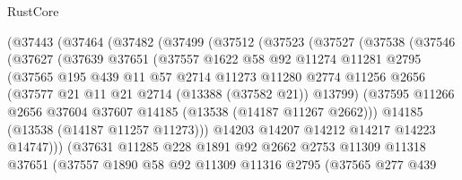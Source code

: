 \begin{lexlean}{RustCore}
\begin{coremodule}
          (@37443
            (@37464
              (@37482
                (@37499
                  (@37512
                    (@37523
                      (@37527
                        (@37538
                          (@37546
                            (@37627
                              (@37639
                                @37651
                                (@37557
                                  @1622
                                  @58
                                  @92
                                  @11274
                                  @11281
                                  @2795
                                  (@37565
                                    @195
                                    @439
                                    @11
                                    @57
                                    @2714
                                    @11273
                                    @11280
                                    @2774
                                    @11256
                                    @2656
                                    (@37577 @21 @11 @21 @2714 (@13388 (@37582 @21)) @13799)
                                    (@37595
                                      @11266
                                      @2656
                                      @37604
                                      @37607
                                      @14185
                                      (@13538 (@14187 @11267 @2662)))
                                    @14185
                                    (@13538 (@14187 @11257 @11273)))
                                  @14203
                                  @14207
                                  @14212
                                  @14217
                                  @14223
                                  @14747)))
                            (@37631
                              @11285
                              @228
                              @1891
                              @92
                              @2662
                              @2753
                              @11309
                              @11318
                              @37651
                              (@37557
                                @1890
                                @58
                                @92
                                @11309
                                @11316
                                @2795
                                (@37565
                                  @277
                                  @439

\end{coremodule}
\end{lexlean}
